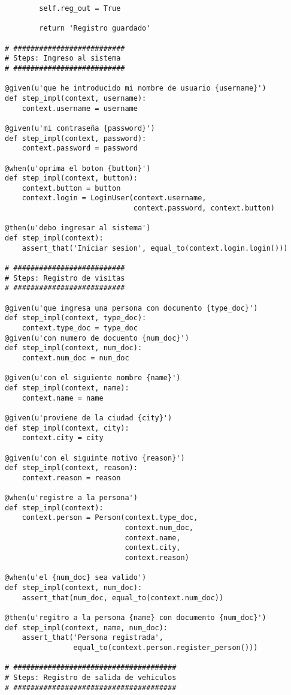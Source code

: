 {\begin{verbatim}
        self.reg_out = True

        return 'Registro guardado'

# ##########################
# Steps: Ingreso al sistema
# ##########################

@given(u'que he introducido mi nombre de usuario {username}')
def step_impl(context, username):
    context.username = username

@given(u'mi contraseña {password}')
def step_impl(context, password):
    context.password = password

@when(u'oprima el boton {button}')
def step_impl(context, button):
    context.button = button
    context.login = LoginUser(context.username,
                              context.password, context.button)

@then(u'debo ingresar al sistema')
def step_impl(context):
    assert_that('Iniciar sesion', equal_to(context.login.login()))

# ##########################
# Steps: Registro de visitas
# ##########################

@given(u'que ingresa una persona con documento {type_doc}')
def step_impl(context, type_doc):
    context.type_doc = type_doc
@given(u'con numero de docuento {num_doc}')
def step_impl(context, num_doc):
    context.num_doc = num_doc

@given(u'con el siguiente nombre {name}')
def step_impl(context, name):
    context.name = name

@given(u'proviene de la ciudad {city}')
def step_impl(context, city):
    context.city = city

@given(u'con el siguinte motivo {reason}')
def step_impl(context, reason):
    context.reason = reason

@when(u'registre a la persona')
def step_impl(context):
    context.person = Person(context.type_doc,
                            context.num_doc,
                            context.name,
                            context.city,
                            context.reason)

@when(u'el {num_doc} sea valido')
def step_impl(context, num_doc):
    assert_that(num_doc, equal_to(context.num_doc))

@then(u'regitro a la persona {name} con documento {num_doc}')
def step_impl(context, name, num_doc):
    assert_that('Persona registrada',
                equal_to(context.person.register_person()))

# ######################################
# Steps: Registro de salida de vehiculos
# ######################################


\end{verbatim}}
